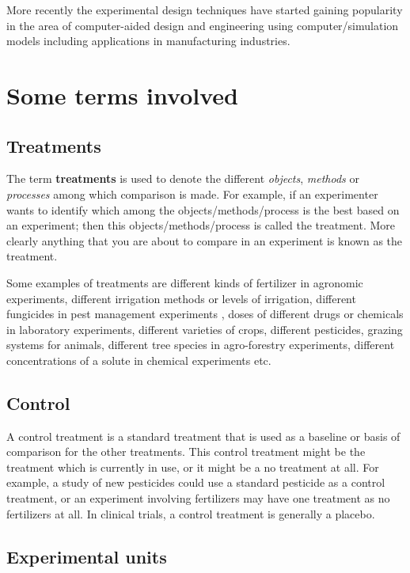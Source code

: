 \documentclass[
]{book}
\begin{document}
More recently the experimental design techniques have started gaining popularity in the area of computer-aided design and engineering using computer/simulation models including applications in manufacturing industries.

\hypertarget{some-terms-involved}{%
\section{Some terms involved}\label{some-terms-involved}}

\hypertarget{treatments}{%
\subsection{Treatments}\label{treatments}}

The term \textbf{treatments} is used to denote the different \emph{objects}, \emph{methods} or \emph{processes} among which comparison is made. For example, if an experimenter wants to identify which among the objects/methods/process is the best based on an experiment; then this objects/methods/process is called the treatment. More clearly anything that you are about to compare in an experiment is known as the treatment.

Some examples of treatments are different kinds of fertilizer in agronomic experiments, different irrigation methods or levels of irrigation, different fungicides in pest management experiments , doses of different drugs or chemicals in laboratory experiments, different varieties of crops, different pesticides, grazing systems for animals, different tree species in agro-forestry experiments, different concentrations of a solute in chemical experiments etc.

\hypertarget{control}{%
\subsection{Control}\label{control}}

A control treatment is a standard treatment that is used as a baseline or basis of comparison for the other treatments. This control treatment might be the treatment which is currently in use, or it might be a no treatment at all. For example, a study of new pesticides could use a standard pesticide as a control treatment, or an experiment involving fertilizers may have one treatment as no fertilizers at all. In clinical trials, a control treatment is generally a placebo.

\hypertarget{experimental-units}{%
\subsection{Experimental units}\label{experimental-units}}
\end{document}
